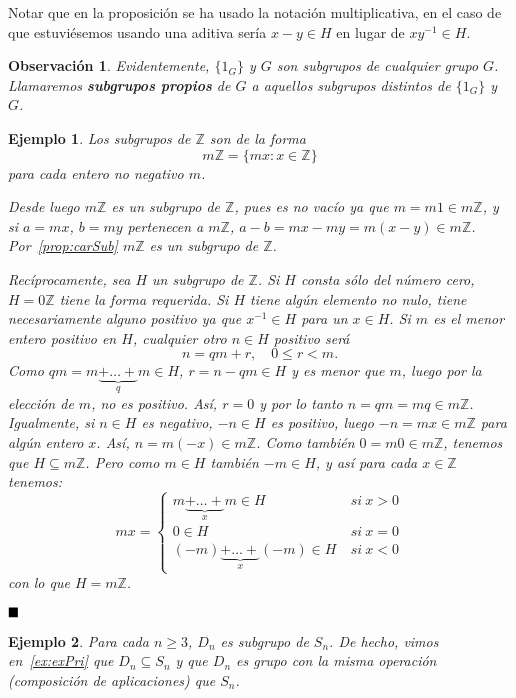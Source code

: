 \documentclass[12pt]{article}
\newtheorem{example}{Ejemplo}[theorem]
\newtheorem{observation}{Observación}[theorem]
\begin{document}
Notar que en la proposición se ha usado la notación multiplicativa, en el caso de que estuviésemos usando una aditiva sería $x-y \in H$ en lugar de $xy^{-1} \in H$.

\begin{observation}Evidentemente, $\lbrace 1_G \rbrace$ y $G$ son subgrupos de cualquier grupo $G$. Llamaremos \textbf{subgrupos propios} de $G$ a aquellos subgrupos distintos de $\lbrace 1_G \rbrace$ y $G$.
\end{observation}

\begin{example}
Los subgrupos de $\mathbb{Z}$ son de la forma $$m\mathbb{Z} = \lbrace mx:x \in \mathbb{Z} \rbrace$$ para cada entero no negativo $m$. 

Desde luego $m\mathbb{Z}$ es un subgrupo de $\mathbb{Z}$, pues es no vacío ya que $m = m1 \in m\mathbb{Z}$, y si $a = mx$, $b = my$ pertenecen a $m\mathbb{Z}$, $a-b = mx-my=m(x-y) \in m\mathbb{Z}$. Por~\ref{prop:carSub} $m\mathbb{Z}$ es un subgrupo de $\mathbb{Z}$.

Recíprocamente, sea $H$ un subgrupo de $\mathbb{Z}$. Si $H$ consta sólo del número cero, $H = 0 \mathbb{Z}$ tiene la forma requerida. Si $H$ tiene algún elemento no nulo, tiene necesariamente alguno positivo ya que $x^{-1} \in H$ para un $x \in H$. Si $m$ es el menor entero positivo en $H$, cualquier otro $n \in H$ positivo será $$n = qm+r, \quad 0 \leq r < m.$$ Como $qm = m\underbrace{+ \ldots + }_q m \in H$, $r = n-qm \in H$ y es menor que $m$, luego por la elección de $m$, no es positivo. Así, $r = 0$ y por lo tanto $n = qm = mq \in m\mathbb{Z}$. Igualmente, si $n \in H$ es negativo, $-n \in H$ es positivo, luego $-n = mx \in m \mathbb{Z}$ para algún entero $x$. Así, $n = m(-x) \in m \mathbb{Z}$. Como también $0 = m0 \in m \mathbb{Z}$, tenemos que $H \subseteq m\mathbb{Z}$. Pero como $m \in H$ también $-m \in H$, y así para cada $x \in \mathbb{Z}$ tenemos: 
$$
mx = \left\{
    \begin{array}{ll}
        m \underbrace{+ \ldots +}_x m \in H &~si~ x>0 \\
        0 \in H &~si~ x=0 \\
        (-m) \underbrace{+ \ldots +}_x (-m) \in H&~si~ x<0
    \end{array}
\right.
$$
con lo que $H = m\mathbb{Z}$.
\end{example}

$\hfill \blacksquare$

\begin{example}\label{ex:DS}
Para cada $n \geq 3$, $D_n$ es subgrupo de $S_n$. De hecho, vimos en~\ref{ex:exPri} que $D_n \subseteq S_n$ y que $D_n$ es grupo con la misma operación (composición de aplicaciones) que $S_n$.
\end{example}
\end{document}
